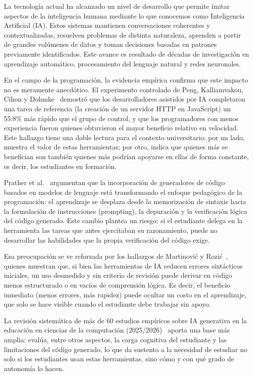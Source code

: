 \documentclass[12pt,letterpaper]{article}
\begin{document}
La tecnología actual ha alcanzado un nivel de desarrollo que permite imitar aspectos de la inteligencia humana mediante lo que conocemos como Inteligencia Artificial (IA). Estos sistemas mantienen conversaciones coherentes y contextualizadas, resuelven problemas de distinta naturaleza, aprenden a partir de grandes volúmenes de datos y toman decisiones basadas en patrones previamente identificados. Este avance es resultado de décadas de investigación en aprendizaje automático, procesamiento del lenguaje natural y redes neuronales.

En el campo de la programación, la evidencia empírica confirma que este impacto no es meramente anecdótico. El experimento controlado de Peng, Kalliamvakou, Cihon y Dohmke~\cite{peng2023impact} demostró que los desarrolladores asistidos por IA completaron una tarea de referencia (la creación de un servidor HTTP en JavaScript) un 55.8\% más rápido que el grupo de control, y que los programadores con menos experiencia fueron quienes obtuvieron el mayor beneficio relativo en velocidad. Este hallazgo tiene una doble lectura para el contexto universitario: por un lado, muestra el valor de estas herramientas; por otro, indica que quienes más se benefician son también quienes más podrían apoyarse en ellas de forma constante, es decir, los estudiantes en formación.

Prather et al.~\cite{prather2023programming} argumentan que la incorporación de generadores de código basados en modelos de lenguaje está transformando el enfoque pedagógico de la programación: el aprendizaje se desplaza desde la memorización de sintaxis hacia la formulación de instrucciones (prompting), la depuración y la verificación lógica del código generado. Este cambio plantea un riesgo: si el estudiante delega en la herramienta las tareas que antes ejercitaban su razonamiento, puede no desarrollar las habilidades que la propia verificación del código exige.

Esa preocupación se ve reforzada por los hallazgos de Martinović y Rozić~\cite{martinovic2024ai}, quienes muestran que, si bien las herramientas de IA reducen errores sintácticos iniciales, un uso desmedido y sin criterio de revisión puede derivar en código menos estructurado o en vacíos de comprensión lógica. Es decir, el beneficio inmediato (menos errores, más rapidez) puede ocultar un costo en el aprendizaje, que solo se hace visible cuando el estudiante debe trabajar sin apoyo.

La revisión sistemática de más de 60 estudios empíricos sobre IA generativa en la educación en ciencias de la computación (2025/2026)~\cite{dialnet2025inteligencia,comillas2025impacto,ups2025inteligencia,scielo2025revision,redalyc2024revision,scielochile2025uso,horizontes2024implicaciones,zenodo2025impacto} aporta una base más amplia: evalúa, entre otros aspectos, la carga cognitiva del estudiante y las limitaciones del código generado, lo que da sustento a la necesidad de estudiar no solo si los estudiantes usan estas herramientas, sino cómo y con qué grado de autonomía lo hacen.
\end{document}
